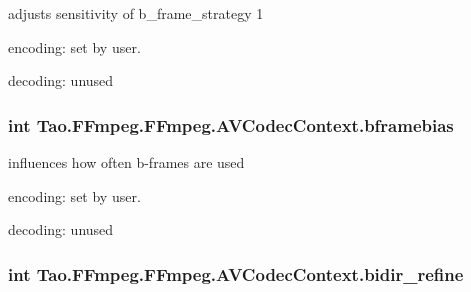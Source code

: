 \label{struct_tao_1_1_f_fmpeg_1_1_f_fmpeg_1_1_a_v_codec_context_adb981afbdb7764f5c573c017554f0f3b}
adjusts sensitivity of b\_\-frame\_\-strategy 1
\begin{DoxyItemize}
\item encoding: set by user.
\item decoding: unused 
\end{DoxyItemize}\hypertarget{struct_tao_1_1_f_fmpeg_1_1_f_fmpeg_1_1_a_v_codec_context_ae207842a5fb6a1df2d14c08fcce2297c}{
\subsubsection[{bframebias}]{\setlength{\rightskip}{0pt plus 5cm}int {\bf Tao.FFmpeg.FFmpeg.AVCodecContext.bframebias}}}
\label{struct_tao_1_1_f_fmpeg_1_1_f_fmpeg_1_1_a_v_codec_context_ae207842a5fb6a1df2d14c08fcce2297c}
influences how often b-\/frames are used
\begin{DoxyItemize}
\item encoding: set by user.
\item decoding: unused 
\end{DoxyItemize}\hypertarget{struct_tao_1_1_f_fmpeg_1_1_f_fmpeg_1_1_a_v_codec_context_a7d8d54ee310bcc4c5439f8b09c7c1ebc}{
\subsubsection[{bidir\_\-refine}]{\setlength{\rightskip}{0pt plus 5cm}int {\bf Tao.FFmpeg.FFmpeg.AVCodecContext.bidir\_\-refine}}}
\label{struct_tao_1_1_f_fmpeg_1_1_f_fmpeg_1_1_a_v_codec_context_a7d8d54ee310bcc4c5439f8b09c7c1ebc}

